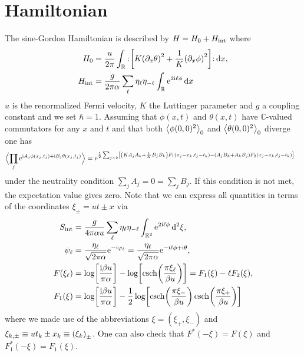 \documentclass[english, parskip=full]{scrartcl}
\title{\titel}
\author{\autor}
\date{\today}
\begin{document}
\maketitle  %

\section{Hamiltonian}
The sine-Gordon Hamiltonian is described by $H=H_0+H_\Text{int}$ where
\begin{align}
H_0 &= \frac{u}{2\pi} \intr{\normord{\klb*{K\kla*{\partial_x\theta}^2 + \frac{1}{K} \kla*{\partial_x\phi}^2}}}{x},\\
H_\Text{int} &= \frac{g}{2\pi\alpha} \sum_\ell \eta_{\ell}\eta_{-\ell} \intr{\powe{2\i\ell \phi}}{x}
\end{align}
$u$ is the renormalized Fermi velocity, $K$ the Luttinger parameter and $g$ a coupling constant and we set $\hbar=1$.
Assuming that $\phi(x,t)$ and $\theta(x,t)$ have $\mathbb{C}$-valued commutators for any $x$ and $t$ and that both $\bra*{\phi(0,0)^2}_0$ and $\bra*{\theta(0,0)^2}_0$ diverge one has
\begin{align}
\bra[\Big]{\prod_j \powe{\i A_j\phi(x_j,t_j) + \i B_j\theta(x_j,t_j)}} &= \powe{\frac{1}{2} \sum_{j<k} \klb*{\kla*{K A_jA_k + \frac{1}{K} B_jB_k} F_1(x_j-x_k,t_j-t_k) - \kla*{A_jB_k + A_kB_j} F_2(x_j-x_k,t_j-t_k)}}
\end{align}
under the neutrality condition $\sum_jA_j=0=\sum_jB_j$.
If this condition is not met, the expectation value gives zero.
Note that we can express all quantities in terms of the coordinates $\xi_\pm = ut\pm x$ via
\begin{align}
S_\Text{int} &= \frac{g}{4\pi\alpha u} \sum_\ell \eta_\ell \eta_{-\ell} \intrnd{2}{\powe{2\i\ell\phi}}{\xi},\\
\psi_\ell &= \frac{\eta_\ell}{\sqrt{2\pi\alpha}} \powe{-\i\varphi_\ell} = \frac{\eta_\ell}{\sqrt{2\pi\alpha}} \powe{-\i \ell \phi + \i \theta},\\
F(\xi_\ell) &= \log\klb*{\frac{\i\beta u}{\pi\alpha}} - \log\klb*{\csch\kla*{\frac{\pi \xi_\ell}{\beta u}}} = F_1(\xi) - \ell F_2(\xi),\\
F_1(\xi) &= \log\klb*{
\frac{\i\beta u}{\pi\alpha}} - \frac{1}{2}\log\klb*{ \csch\kla*{\frac{\pi \xi_-}{\beta u}} \csch\kla*{\frac{\pi \xi_+}{\beta u}}}
\end{align}
where we made use of the abbreviations $\xi = (\xi_+,\xi_-)$ and $\xi_{k,\pm} \equiv ut_k \pm x_k \equiv \kla*{\xi_k}_\pm$.
One can also check that $F^\ast(-\xi)=F(\xi)$ and $F_1^\ast(-\xi) = F_1(\xi)$.
\end{document}
